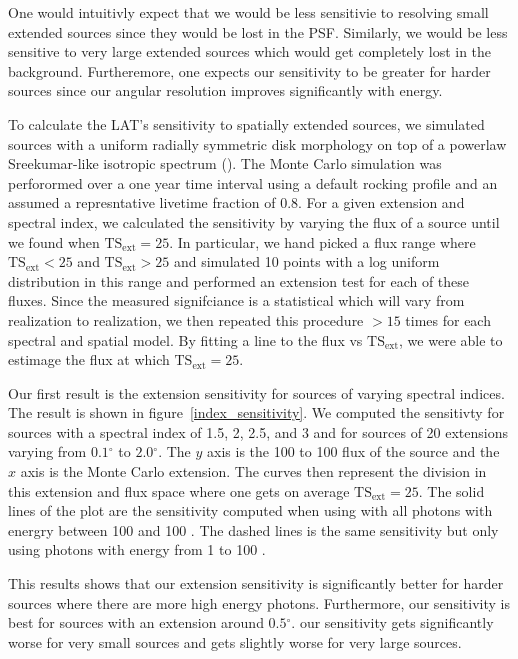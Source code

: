 \documentclass[12pt,preprint]{aastex}
\newcommand{\mev}{\text{MeV}\xspace}
\newcommand{\gev}{\text{GeV}\xspace}
\newcommand{\tsext}{{\ensuremath{\text{TS}_\text{ext}}}\xspace}
\renewcommand{\deg}{\ensuremath{^\circ}\xspace}
\begin{document}
One would intuitivly expect that we would be less sensitivie to resolving
small extended sources since they would be lost in the PSF.  Similarly,
we would be less sensitive to very large extended sources which would
get completely lost in the background. Furtheremore, one expects our
sensitivity to be greater for harder sources since our angular resolution
improves significantly with energy.

To calculate the LAT's sensitivity to spatially extended sources,
we simulated sources with a uniform radially symmetric
disk morphology on top of a powerlaw Sreekumar-like isotropic
spectrum (\cite{sreekumar_isotropic}).  The Monte Carlo
simulation was perforormed over a one year time interval using a default
rocking profile and an assumed a represntative livetime fraction of 0.8.
For a given extension and spectral index, we calculated the
sensitivity by varying the flux of a source until we found 
when $\tsext=25$. In particular, we hand picked a flux range
where $\tsext<25$ and $\tsext>25$ and simulated 10 points with
a log uniform distribution in this range and performed an extension
test for each of these fluxes. Since the measured signifciance is
a statistical which will vary from realization to realization,
we then repeated this procedure $>15$ times for each spectral
and spatial model.  By fitting a line to the flux vs $\tsext$, we were
able to estimage the flux at which $\tsext=25$.

Our first result is the extension sensitivity for sources of varying
spectral indices. The result is shown in figure~\ref{index_sensitivity}.
We computed the sensitivty for sources with a spectral index of 1.5,
2, 2.5, and 3 and for sources of 20 extensions varying from $0.1\deg$
to $2.0\deg$. The $y$ axis is the 100 \mev to 100 \gev flux of the
source and the $x$ axis is the Monte Carlo extension. The curves then
represent the division in this extension and flux space where one gets
on average $\tsext=25$.
The solid lines of the plot are the sensitivity computed when using
with all photons with energry between 100 \mev and 100 \gev. The dashed lines is the
same sensitivity but only using photons with energy from 1 \gev to 100 \gev.

This results shows that our extension sensitivity is
significantly better for harder sources where there are more high
energy photons. Furthermore, our sensitivity is best for sources with an
extension around $0.5\deg$.  our sensitivity gets significantly worse
for very small sources and gets slightly worse for very large sources.
\end{document}
